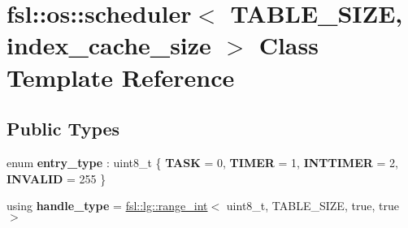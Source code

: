 \hypertarget{classfsl_1_1os_1_1scheduler}{}\section{fsl\+::os\+::scheduler$<$ T\+A\+B\+L\+E\+\_\+\+S\+I\+ZE, index\+\_\+cache\+\_\+size $>$ Class Template Reference}
\label{classfsl_1_1os_1_1scheduler}
\subsection*{Public Types}
\begin{DoxyCompactItemize}
\item 
\mbox{\label{classfsl_1_1os_1_1scheduler_a54b981f2536858ee3d6daedb7cb3f34f}} 
enum {\bfseries entry\+\_\+type} \+: uint8\+\_\+t \{ {\bfseries T\+A\+SK} = 0, 
{\bfseries T\+I\+M\+ER} = 1, 
{\bfseries I\+N\+T\+T\+I\+M\+ER} = 2, 
{\bfseries I\+N\+V\+A\+L\+ID} = 255
 \}
\item 
\mbox{\label{classfsl_1_1os_1_1scheduler_a9da241dcd0a205cf08bd39c0d7802d4e}} 
using {\bfseries handle\+\_\+type} = \mbox{\hyperlink{classfsl_1_1lg_1_1range__int}{fsl\+::lg\+::range\+\_\+int}}$<$ uint8\+\_\+t, T\+A\+B\+L\+E\+\_\+\+S\+I\+ZE, true, true $>$
\end{DoxyCompactItemize}
